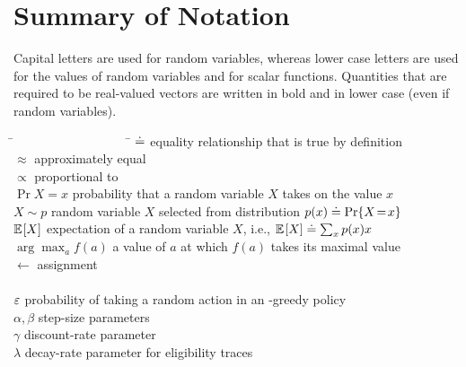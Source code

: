 \documentclass[a4paper, twoside, 12pt]{article}
\begin{document}
\section*{Summary of Notation} 
Capital letters are used for random variables, whereas lower case letters are used for
the values of random variables and for scalar functions. Quantities that are required to
be real-valued vectors are written in bold and in lower case (even if random variables).
\begin{tabbing}
    \=~~~~~~~~~~~~~~~~~~  \= \kill
    \>$\doteq$            \> equality relationship that is true by definition\\
    \>$\approx$           \> approximately equal\\
    \>$\propto$           \> proportional to\\
    \>$\Pr{X\!=\!x}$      \> probability that a random variable $X$ takes on the value $x$\\
    \>$X\sim p$           \> random variable $X$ selected from distribution $p(x)\doteq{{\rm Pr\!}\left\{X\!=\!x\right\}}$\\
    \>$\mathbb{E}_{\,\!\!}\left[X\right]$             \> expectation of a random variable $X$, i.e., $\mathbb{E}_{\,\!\!}\left[X\right]\doteq\sum_x p(x)x$\\
    \>$\arg\max_a f(a)$   \> a value of $a$ at which $f(a)$ takes its maximal value\\
    \>$\leftarrow$        \> assignment\\
    \\
    \>$\mbox{$\varepsilon$}$                \> probability of taking a random action in an \e-greedy policy\\
    \>$\alpha, \beta$     \> step-size parameters\\
    \>$\gamma$            \> discount-rate parameter\\
    \>$\lambda$           \> decay-rate parameter for eligibility traces\\

\end{tabbing}
\end{document}
